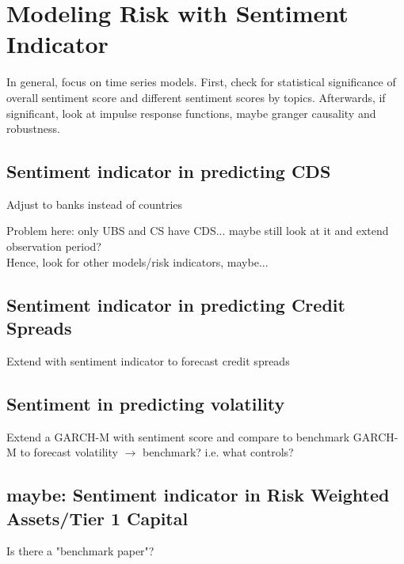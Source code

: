 \chapter{Modeling Risk with Sentiment Indicator}\label{sec6}
\thispagestyle{empty}

In general, focus on time series models. First, check for statistical significance of overall sentiment score and different sentiment scores by topics. Afterwards, if significant, look at impulse response functions, maybe granger causality and robustness.

\section{Sentiment indicator in predicting CDS}

Adjust \cite{cathcart2020} to banks instead of countries

Problem here: only UBS and CS have CDS... maybe still look at it and extend observation period?\\


\noindent
Hence, look for other models/risk indicators, maybe...

\section{Sentiment indicator in predicting Credit Spreads}

Extend \cite{collin2001} with sentiment indicator to forecast credit spreads


\section{Sentiment in predicting volatility}

Extend a GARCH-M with sentiment score and compare to benchmark GARCH-M to forecast volatility $\rightarrow$ benchmark? i.e. what controls?

\section{maybe: Sentiment indicator in Risk Weighted Assets/Tier 1 Capital}

Is there a "benchmark paper"?


\cleardoublepage
